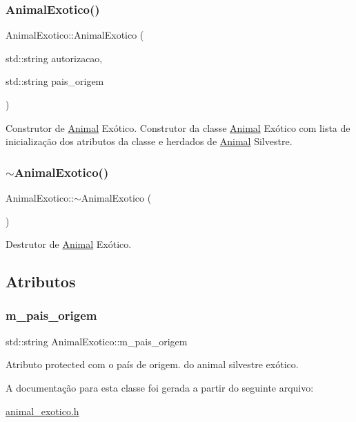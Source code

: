 \subsubsection{\texorpdfstring{Animal\+Exotico()}{AnimalExotico()}}
{\footnotesize\ttfamily Animal\+Exotico\+::\+Animal\+Exotico (\begin{DoxyParamCaption}\item[{std\+::string}]{autorizacao,  }\item[{std\+::string}]{pais\+\_\+origem }\end{DoxyParamCaption})}

Construtor de \hyperlink{classAnimal}{Animal} Exótico. Construtor da classe \hyperlink{classAnimal}{Animal} Exótico com lista de inicialização dos atributos da classe e herdados de \hyperlink{classAnimal}{Animal} Silvestre. \mbox{\label{classAnimalExotico_a3bce432a5e14f93e6d5254ce86075d36}} 
\subsubsection{\texorpdfstring{$\sim$\+Animal\+Exotico()}{~AnimalExotico()}}
{\footnotesize\ttfamily Animal\+Exotico\+::$\sim$\+Animal\+Exotico (\begin{DoxyParamCaption}{ }\end{DoxyParamCaption})}

Destrutor de \hyperlink{classAnimal}{Animal} Exótico. 

\subsection{Atributos}
\mbox{\label{classAnimalExotico_a5a00f07c9cd9f11baadef0282eaad031}} 
\subsubsection{\texorpdfstring{m\+\_\+pais\+\_\+origem}{m\_pais\_origem}}
{\footnotesize\ttfamily std\+::string Animal\+Exotico\+::m\+\_\+pais\+\_\+origem\hspace{0.3cm}{\ttfamily [protected]}}

Atributo protected com o país de origem. do animal silvestre exótico. 

A documentação para esta classe foi gerada a partir do seguinte arquivo\+:\begin{DoxyCompactItemize}
\item 
\hyperlink{animal__exotico_8h}{animal\+\_\+exotico.\+h}\end{DoxyCompactItemize}
